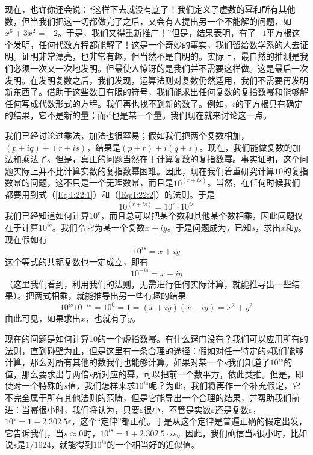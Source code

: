 现在，也许你还会说：“这样下去就没有底了！我们定义了虚数的幂和所有其他数，但当我们把这一切都做完了之后，又会有人提出另一个不能解的问题，如$x^6+3x^2=-2$。于是，我们又得重新推广！”但是，结果表明，有了$-1$平方根这个发明，任何代数方程都能解了！这是一个奇妙的事实，我们留给数学系的人去证明。证明非常漂亮，也非常有趣，但当然不是自明的。实际上，最自然的推测是我们必须一次又一次地发明。但最使人惊讶的是我们并不需要这样做。这是最后一次发明。在发明复数之后，我们发现，运算法则对复数仍然适用，我们不需要再发明新东西了。借助于这些数目有限的符号，我们能求出任何复数的复指数幂和能够解任何写成代数形式的方程。我们再也找不到新的数了。例如，$i$的平方根具有确定的结果，它不是新的量；而$i^{i}$也是某一个量。我们现在就来讨论这一点。

我们已经讨论过乘法，加法也很容易；假如我们把两个复数相加，$(p+iq)+(r+is)$，结果是$(p+r)+i(q+s)$。现在，我们能做复数的加法和乘法了。但是，真正的问题当然在于计算复数的复指数幂。事实证明，这个问题实际上并不比计算实数的复指数幂困难。因此，现在我们着重研究计算$10$的复指数幂的问题，这不只是一个无理数幂，而且是$10^{(r+is)}$。当然，在任何时候我们都要用到式（\ref{Eq:I:22:1}）和（\ref{Eq:I:22:2}）的法则。于是
\begin{equation}
    \label{Eq:I:22:5}
    10^{(r+is)}=10^r\cdot 10^{is}
\end{equation}
我们已经知道如何计算$10^r$，而且总可以把某个数和其他某个数相乘，因此问题仅在于计算$10^{is}$。我们令它为某一个复数$x+iy$。于是问题成为，已知$s$，求出$x$和$y$。现在假如有
\begin{equation*}
    10^{is} = x + iy
\end{equation*}
这个等式的共轭复数也一定成立，即有
\begin{equation*}
    10^{-is} = x - iy
\end{equation*}
（这里我们看到，利用我们的法则，无需进行任何实际计算，就能推导出一些结果）。把两式相乘，就能推导出另一些有趣的结果
\begin{equation}
    \label{Eq:I:22:6}
    10^{is}10^{-is}=10^0=1=(x+iy)(x-iy)=x^2+y^2
\end{equation}
由此可见，如果求出$x$，也就有了$y$。

现在的问题是如何计算$10$的一个虚指数幂。有什么窍门没有？我们可以应用所有的法则，直到碰壁为止，但是这里有一条合理的途径：假如对任一特定的$s$我们能够计算，那么对所有其他的数我们也能够计算。如果对某一个$s$我们知道了$10^{is}$的值，那么要求出与两倍$s$所对应的幂，可以把前一个数平方，依此类推。但是，即使对一个特殊的$s$值，我们怎样来求$10^{is}$呢？为此，我们将再作一个补充假定，它不完全属于所有其他法则的范畴，但是它能导出一个合理的结果，并帮助我们前进：当幂很小时，我们将认为，只要$\varepsilon$很小，不管是实数$\varepsilon$还是复数$\varepsilon$，$10^{\varepsilon}=1+2.302~5\varepsilon$，这个“定律”都正确。于是从这个定律是普遍正确的假定出发，它告诉我们，当$s\approx 0$时，$10^{is}=1+2.302~5\cdot is$。因此，我们确信当$s$很小时，比如说$s$是$1/1 024$，就能得到$10^{is}$的一个相当好的近似值。

